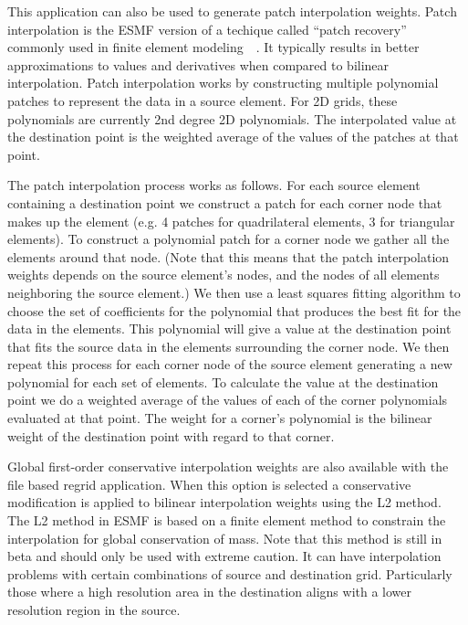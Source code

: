  This application can also be used to generate patch interpolation weights. Patch
interpolation is the ESMF version of a techique called ``patch recovery'' commonly
used in finite element modeling~\cite{PatchInterp1}~\cite{PatchInterp2}. It typically results in better approximations to values and derivatives when compared to bilinear interpolation.  
Patch interpolation works by constructing multiple polynomial patches to represent
the data in a source element. For 2D grids, these polynomials 
are currently 2nd degree 2D polynomials. The interpolated value at the destination point 
is the weighted average of the values of the patches at that point. 

The patch interpolation process works as follows. 
For each source element containing a destination point
we construct a patch for each corner node that makes up the element (e.g. 4 patches for 
quadrilateral elements, 3 for triangular elements). To construct a polynomial patch for
 a corner node we gather all the elements around that node. 
(Note that this means that the patch interpolation weights depends on the source 
element's nodes, and the nodes of all elements neighboring the source element.)  
We then use a least squares fitting algorithm to choose the set of coefficients 
for the polynomial that produces the best fit for the data in the elements. 
This polynomial will give a value at the destination point that fits the source data 
in the elements surrounding the corner node. We then repeat this process for each 
corner node of the source element generating a new polynomial for each set of elements.  
To calculate the value at the destination point we do a weighted average of the values 
of each of the corner polynomials evaluated at that point. The weight for a corner's 
polynomial is the bilinear weight of the destination point with regard to that corner.  

Global first-order conservative interpolation weights are also available with the 
file based regrid application. When this option is selected a conservative modification
is applied to bilinear interpolation weights using the L2 method.  The L2 method in ESMF is based
on a finite element method to constrain the interpolation for global conservation of 
mass. Note that this method is still in beta and should only be used with extreme caution.
It can have interpolation problems with certain combinations of source and destination grid. 
Particularly those where a high resolution area in the destination aligns with a lower resolution 
region in the source. 

